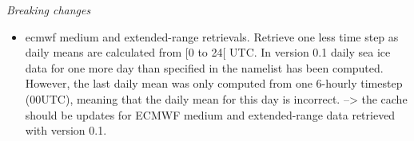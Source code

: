 \documentclass[DIV=10, parskip=full]{scrreprt}
\begin{document}
\textit{Breaking changes}
\begin{itemize}
	\item ecmwf medium and extended-range retrievals. Retrieve one less time step as daily means are calculated from [0 to 24[ UTC. In version 0.1 daily sea ice data for one more day than specified in the namelist has been computed. However, the last daily mean was only computed from one 6-hourly timestep (00UTC), meaning that the daily mean for this day is incorrect. --> the cache should be updates for ECMWF medium and extended-range data retrieved with version 0.1.
\end{itemize}

\clearpage
{}


\end{document}
